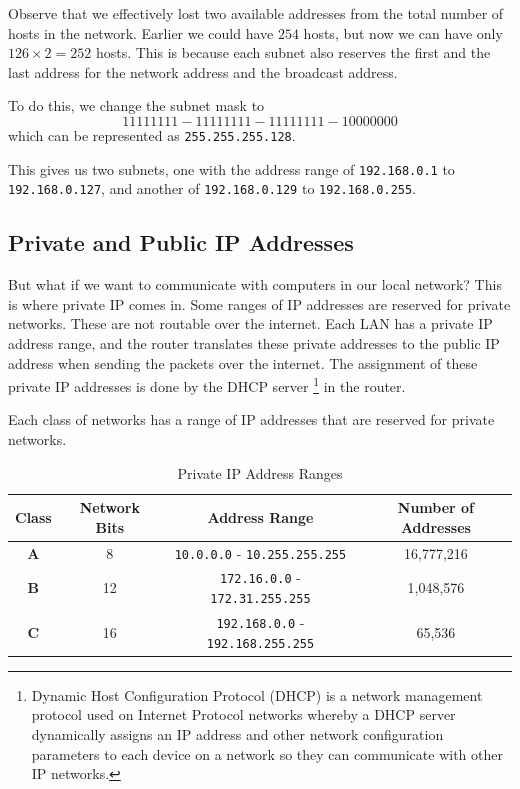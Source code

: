 \begin{remark}
Observe that we effectively lost two available addresses
from the total number of hosts in the network.
Earlier we could have $254$ hosts, but now we can
have only $126 \times 2 = 252$ hosts. This is because
each subnet also reserves the first and the last
address for the network address and the broadcast
address.
\end{remark}

To do this, we change the subnet mask to
\[
1111 1111 - 1111 1111 - 1111 1111 - 1000 0000
\]
which can be represented as \lstinline|255.255.255.128|.

This gives us two subnets, one with the address range
of \lstinline|192.168.0.1| to \lstinline|192.168.0.127|, and
another of \lstinline|192.168.0.129| to \lstinline|192.168.0.255|.

\subsection{Private and Public IP Addresses}

But what if we want to communicate with computers
in our local network? This is where private IP
comes in. Some ranges of IP addresses are reserved
for private networks. These are not routable over
the internet. Each LAN has a private IP address
range, and the router translates these private
addresses to the public IP address when sending
the packets over the internet. The assignment
of these private IP addresses is done by the
DHCP server
\footnote{
  Dynamic Host Configuration Protocol (DHCP) is
  a network management protocol used on Internet
  Protocol networks whereby a DHCP server dynamically
  assigns an IP address and other network configuration
  parameters to each device on a network so they can
  communicate with other IP networks.
}
in the router.

Each class of networks has a range of IP addresses
that are reserved for private networks.

\begin{table}[h!]
\caption{Private IP Address Ranges}
\begin{tabular}{c c c c}
\toprule
Class & Network Bits & Address Range & Number of Addresses \\
\midrule
\textbf{A} & 8 & \lstinline|10.0.0.0| - \lstinline|10.255.255.255| & 16,777,216 \\
\textbf{B} & 12 & \lstinline|172.16.0.0| - \lstinline|172.31.255.255| & 1,048,576 \\
\textbf{C} & 16 & \lstinline|192.168.0.0| - \lstinline|192.168.255.255| & 65,536 \\
\bottomrule
\end{tabular}
\end{table}


